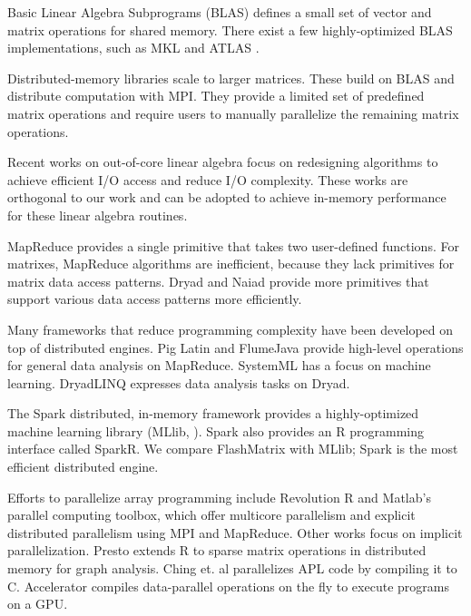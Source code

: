 Basic Linear Algebra Subprograms (BLAS) defines a small set of vector and
matrix operations for shared memory. There exist a few highly-optimized BLAS
implementations, such as MKL \cite{mkl} and ATLAS \cite{atlas}. 

Distributed-memory libraries \cite{trilinos, petsc, elemental}
scale to larger matrices. 
These build on BLAS and distribute computation with MPI.
They provide a limited set of predefined matrix operations and
require users to manually parallelize the remaining matrix operations.

Recent works on out-of-core linear algebra \cite{Toledo99, Quintana-Orti12}
focus on redesigning algorithms to achieve efficient I/O access and reduce I/O
complexity. These works are orthogonal to our work and can be adopted to
achieve in-memory performance for these linear algebra routines.

MapReduce \cite{mapreduce} 
provides a single primitive that takes two user-defined functions. 
For matrixes, MapReduce algorithms are inefficient, because they lack
primitives for matrix data access patterns.
Dryad \cite{dryad} and Naiad \cite{naiad} provide more primitives 
that support various data access patterns more efficiently.

Many frameworks that reduce programming complexity have been developed on top of distributed engines.
Pig Latin \cite{pig} and FlumeJava \cite{flumejava}
provide high-level operations for general data analysis on MapReduce.
SystemML \cite{systemml} has a focus on machine learning. 
DryadLINQ \cite{dryadlinq} expresses data analysis tasks on Dryad. 

The Spark \cite{spark} distributed, in-memory framework
provides a highly-optimized machine learning library (MLlib, \cite{mllib}).
Spark also provides an R programming interface called SparkR.  
We compare FlashMatrix with MLlib; Spark is the most efficient distributed engine.

Efforts to parallelize array programming include
Revolution R \cite{rre} and Matlab's parallel computing toolbox, which
offer multicore parallelism and explicit distributed parallelism using MPI and MapReduce. 
Other works focus on implicit parallelization.
Presto \cite{presto} extends R to sparse matrix operations in distributed memory for graph
analysis. Ching et. al \cite{Ching12} parallelizes APL code by
compiling it to C. Accelerator \cite{accelerator} compiles
data-parallel operations on the fly to execute programs on a GPU.
